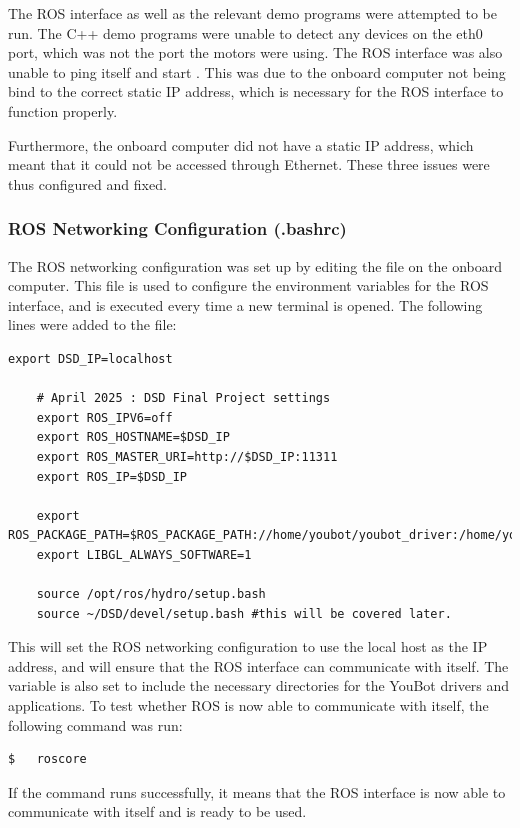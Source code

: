 \documentclass[a4paper, 12pt]{article}
\newcommand{\code}[1]{\texttt{\detokenize{#1}}}
\begin{document}
    The ROS interface as well as the relevant demo programs were attempted to be run. The C++ demo programs were unable to detect any devices on the eth0 port, which was not the port the motors were using. The ROS interface was also unable to ping itself and start \code{roscore}. This was due to the onboard computer not being bind to the correct static IP address, which is necessary for the ROS interface to function properly.

    Furthermore, the onboard computer did not have a static IP address, which meant that it could not be accessed through Ethernet. These three issues were thus configured and fixed.

    \subsubsection{ROS Networking Configuration (.bashrc)}
    The ROS networking configuration was set up by editing the \code{.bashrc} file on the onboard computer. This file is used to configure the environment variables for the ROS interface, and is executed every time a new terminal is opened. The following lines were added to the \code{.bashrc} file:

    \begin{lstlisting}[style=plain]
    export DSD_IP=localhost

    # April 2025 : DSD Final Project settings
    export ROS_IPV6=off
    export ROS_HOSTNAME=$DSD_IP
    export ROS_MASTER_URI=http://$DSD_IP:11311
    export ROS_IP=$DSD_IP

    export ROS_PACKAGE_PATH=$ROS_PACKAGE_PATH://home/youbot/youbot_driver:/home/youbot/ros_stacks:/home/youbot/applications
    export LIBGL_ALWAYS_SOFTWARE=1

    source /opt/ros/hydro/setup.bash
    source ~/DSD/devel/setup.bash #this will be covered later.
    \end{lstlisting}

    This will set the ROS networking configuration to use the local host as the IP address, and will ensure that the ROS interface can communicate with itself. The \code{ROS_PACKAGE_PATH} variable is also set to include the necessary directories for the YouBot drivers and applications. To test whether ROS is now able to communicate with itself, the following command was run:
    \begin{lstlisting}[style=plain]
$   roscore 
    \end{lstlisting}
    If the command runs successfully, it means that the ROS interface is now able to communicate with itself and is ready to be used. 
\end{document}
